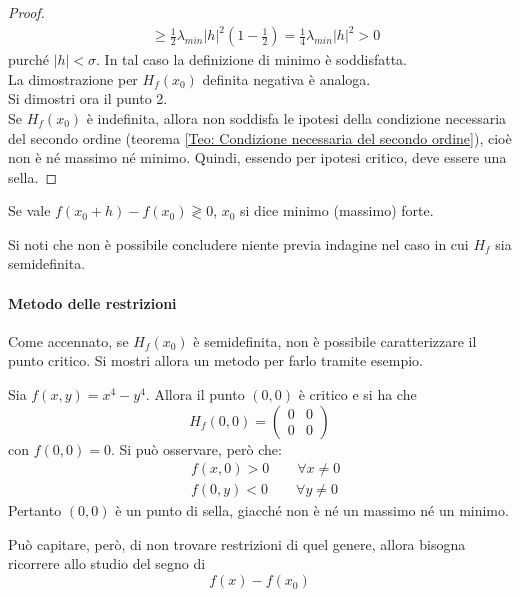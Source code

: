 \begin{proof}
\begin{equation}
\begin{aligned}
            &\geq \frac{1}{2}\lambda_{min}|h|^2\left(1-\frac{1}{2}\right)=\frac{1}{4}\lambda_{min}|h|^2 >0
            \end{aligned}
        \end{equation}
        purché $|h|< \sigma$. In tal caso la definizione di minimo è soddisfatta.\\
        La dimostrazione per $H_f(x_0)$ definita negativa è analoga.\\
    Si dimostri ora il punto 2.\\
    Se $H_f(x_0)$ è indefinita, allora non soddisfa le ipotesi della condizione necessaria del secondo ordine (teorema \ref{Teo: Condizione necessaria del secondo ordine}), cioè non è né massimo né minimo. Quindi, essendo per ipotesi critico, deve essere una sella.
    \end{proof}
    \begin{oss}
        Se vale $f(x_0+h)-f(x_0) \gtrless 0$, $x_0$ si dice minimo (massimo) forte.
    \end{oss}
    \begin{oss}
        Si noti che non è possibile concludere niente previa indagine nel caso in cui $H_f$ sia semidefinita.
    \end{oss}
    \paragraph{Metodo delle restrizioni} Come accennato, se $H_f(x_0)$ è semidefinita, non è possibile caratterizzare il punto critico. Si mostri allora un metodo per farlo tramite esempio.
    \begin{example}
        Sia $f(x,y)=x^4-y^4$. Allora il punto $(0,0)$ è critico e si ha che
        \begin{equation*}
            H_f(0,0)=\begin{pmatrix}
                0 & 0\\
                0 & 0
            \end{pmatrix}
        \end{equation*}
        con $f(0,0)=0$. Si può osservare, però che:
        \begin{equation*}
            \begin{aligned}
                &f(x, 0) > 0 \qquad \forall x \neq 0\\
                &f(0,y) < 0 \qquad \forall y \neq 0
            \end{aligned}
        \end{equation*}
        Pertanto $(0,0)$ è un punto di sella, giacché non è né un massimo né un minimo.
    \end{example}
    Può capitare, però, di non trovare restrizioni di quel genere, allora bisogna ricorrere allo studio del segno di
    \begin{equation*}
        f(x)-f(x_0)
    \end{equation*}
